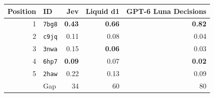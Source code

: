 \begin{tabular}{@{}rlrrr@{}}
\toprule
Position & ID & Jev & Liquid d1 & GPT-6 Luna Decisions \\
\midrule
1 & \texttt{7bg8} & \textbf{0.43} & \textbf{0.66} & \textbf{0.82} \\
2 & \texttt{c9jq} & 0.11 & 0.08 & 0.04 \\
3 & \texttt{3nwa} & 0.15 & \textbf{0.06} & 0.03 \\
4 & \texttt{6hp7} & \textbf{0.09} & 0.07 & \textbf{0.02} \\
5 & \texttt{2haw} & 0.22 & 0.13 & 0.09 \\
\midrule
 & Gap & 34 & 60 & 80 \\
\bottomrule
\end{tabular}%

